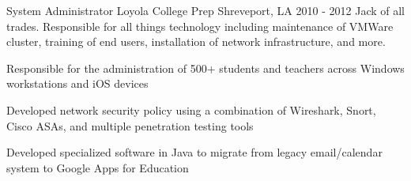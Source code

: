 \begin{cventries}
  \cventrysix
    {System Administrator} %
    {Loyola College Prep} %
    {Shreveport, LA} %
    {2010 - 2012} %
    {Jack of all trades.  Responsible for all things technology including maintenance of VMWare cluster, training of end users, installation of network infrastructure, and more.} %
    {
      \begin{cvitems} %
        \item {Responsible for the administration of 500+ students and teachers across Windows workstations and iOS devices}
        \item {Developed network security policy using a combination of Wireshark, Snort, Cisco ASAs, and multiple penetration testing tools}
        \item {Developed specialized software in Java to migrate from legacy email/calendar system to Google Apps for Education}
      \end{cvitems}
    }

\end{cventries}
